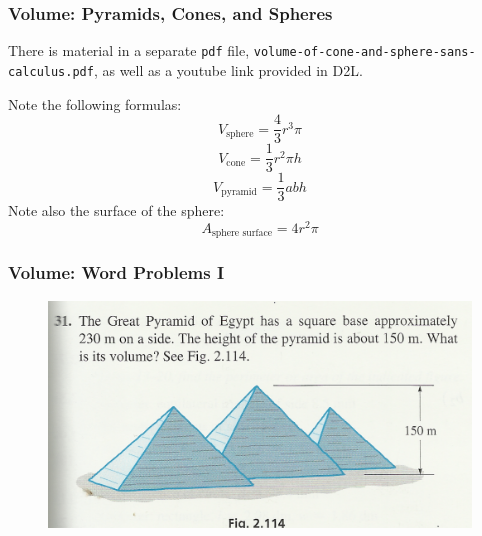 \documentclass[xcolor=dvipsnames]{beamer}
\begin{document}
\begin{frame}
  \frametitle{Volume: Pyramids, Cones, and Spheres}
  There is material in a separate \texttt{pdf} file,
  \texttt{volume-of-cone-and-sphere-sans-calculus.pdf}, as well as a
  youtube link provided in D2L.

  
Note the following formulas:
\begin{equation}
  \label{eq:joyakuap}
  V_{\mbox{sphere}}=\frac{4}{3}r^{3}\pi
\end{equation}
\begin{equation}
  \label{eq:ahquieye}
  V_{\mbox{cone}}=\frac{1}{3}r^{2}\pi{}h
\end{equation}
\begin{equation}
  \label{eq:kooshogu}
  V_{\mbox{pyramid}}=\frac{1}{3}abh
\end{equation}
Note also the surface of the sphere:
\begin{equation}
  \label{eq:aighaing}
  A_{\mbox{sphere surface}}=4r^{2}\pi
\end{equation}
\end{frame}

\begin{frame}
  \frametitle{Volume: Word Problems I}
  \begin{figure}[h]
    \includegraphics[scale=1]{./volume1.png}
  \end{figure}
\end{frame}
\end{document}
